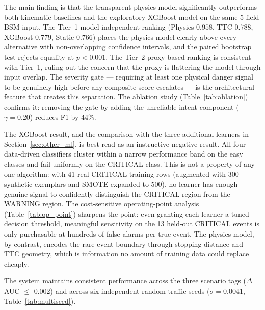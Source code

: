 \documentclass[sn-mathphys-num,Numbered,iicol]{sn-jnl}
\begin{document}
The main finding is that the transparent physics model significantly outperforms both kinematic baselines and the exploratory XGBoost model on the same 5-field BSM input. The Tier~1 model-independent ranking (Physics $0.958$, TTC $0.788$, XGBoost $0.779$, Static $0.766$) places the physics model clearly above every alternative with non-overlapping confidence intervals, and the paired bootstrap test rejects equality at $p<0.001$. The Tier~2 proxy-based ranking is consistent with Tier~1, ruling out the concern that the proxy is flattering the model through input overlap. The severity gate --- requiring at least one physical danger signal to be genuinely high before any composite score escalates --- is the architectural feature that creates this separation. The ablation study (Table~\ref{tab:ablation}) confirms it: removing the gate by adding the unreliable intent component ($\gamma=0.20$) reduces F1 by 44\%.

The XGBoost result, and the comparison with the three additional learners in Section~\ref{sec:other_ml}, is best read as an instructive negative result. All four data-driven classifiers cluster within a narrow performance band on the easy classes and fail uniformly on the CRITICAL class. This is not a property of any one algorithm: with 41 real CRITICAL training rows (augmented with 300 synthetic exemplars and SMOTE-expanded to 500), no learner has enough genuine signal to confidently distinguish the CRITICAL region from the WARNING region. The cost-sensitive operating-point analysis (Table~\ref{tab:op_point}) sharpens the point: even granting each learner a tuned decision threshold, meaningful sensitivity on the 13 held-out CRITICAL events is only purchasable at hundreds of false alarms per true event. The physics model, by contrast, encodes the rare-event boundary through stopping-distance and TTC geometry, which is information no amount of training data could replace cheaply.

The system maintains consistent performance across the three scenario tags ($\Delta$AUC $\le$ 0.002) and across six independent random traffic seeds ($\sigma=0.0041$, Table~\ref{tab:multiseed}).
\end{document}
